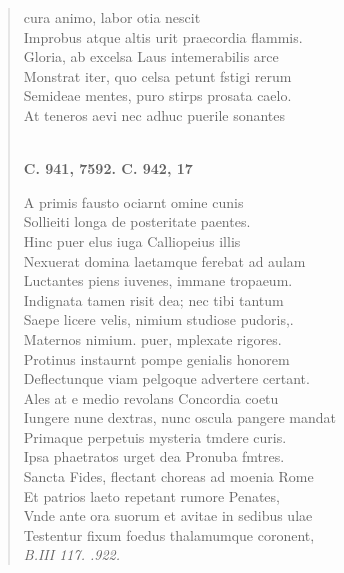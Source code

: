 \documentclass[11pt, a4paper]{report}
\begin{document}
\begin{verse}
cura animo, labor otia nescit \\ Improbus atque altis urit praecordia flammis. \\ Gloria, ab excelsa Laus intemerabilis arce \\ Monstrat iter, quo celsa petunt fstigi rerum \\ Semideae mentes, puro stirps prosata caelo. \\ At teneros aevi nec adhuc puerile sonantes \\ 
        ﻿\pagebreak 
    \begin{center} \textbf{C. 941, 7592. C. 942, 17} \end{center} \marginpar{[364]} A primis fausto ociarnt omine cunis \\ Sollieiti longa de posteritate paentes. \\ Hinc puer elus iuga Calliopeius illis \\ Nexuerat domina laetamque ferebat ad aulam \\ Luctantes piens iuvenes, immane tropaeum. \\ Indignata tamen risit dea; nec tibi tantum \\ Saepe licere velis, nimium studiose pudoris,. \\ Maternos nimium. puer, mplexate rigores. \\ Protinus instaurnt pompe genialis honorem \\ Deflectunque viam pelgoque advertere certant. \\ Ales at e medio revolans Concordia coetu \\ Iungere nune dextras, nunc oscula pangere mandat \\ Primaque perpetuis mysteria tmdere curis. \\ Ipsa phaetratos urget dea Pronuba fmtres. \\ Sancta Fides, flectant choreas ad moenia Rome \\ Et patrios laeto repetant rumore Penates, \\ Vnde ante ora suorum et avitae in sedibus ulae \\ Testentur fixum foedus thalamumque coronent, \\ \textit{B.III 117. .922.} \\ 
      \end{verse}
  
\end{document}
